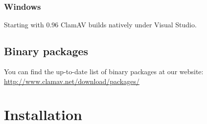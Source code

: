 \documentclass[a4paper,titlepage,12pt]{article}
\begin{document}
	\subsubsection{Windows}
	Starting with 0.96 ClamAV builds natively under Visual Studio.

    \subsection{Binary packages}
    You can find the up-to-date list of binary packages at our website:
    \url{http://www.clamav.net/download/packages/}

    \section{Installation}
\end{document}

